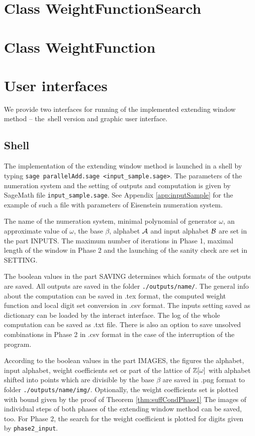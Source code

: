 \section{Class WeightFunctionSearch}



\section{Class WeightFunction}


\section{User interfaces}
We provide two interfaces for running of the implemented extending window method -- the~shell version and graphic user interface.

\subsection{Shell}
The implementation of the extending window method is launched in a shell by typing \verb+sage parallelAdd.sage <input_sample.sage>+. The parameters of the numeration system and the setting of outputs and computation is given by SageMath file \verb+input_sample.sage+. See Appendix \ref{app:inputSample} for the example of such a file with parameters of Eisenstein numeration system.

The name of the numeration system, minimal polynomial of generator $\omega$, an approximate value of $\omega$, the base $\beta$, alphabet $\mathcal{A}$ and input alphabet $\mathcal{B}$ are set in the part INPUTS. The maximum number of iterations in Phase 1, maximal length of the window in Phase 2 and the launching of the sanity check are set in SETTING. 

The boolean values in the part SAVING determines which formats of the outputs are saved. All outputs are saved in the folder \verb+./outputs/name/+. The general info about the computation can be saved in .tex format, the computed weight function and local digit set conversion in .csv format. The inputs setting saved as dictionary can be loaded by the interact interface. The log of the whole computation can be saved as .txt file. There is also an option to save unsolved combinations in Phase 2 in .csv format in the case of the interruption of the program.

According to the boolean values in the part IMAGES, the figures the alphabet, input alphabet, weight coefficients set or part of the lattice of $\mathbb{Z}[\omega]$ with alphabet shifted into points which are divisible by the base $\beta$ are saved in .png format to folder \verb+./outputs/name/img/+. Optionally, the weight coefficients set is plotted with bound given by the proof of Theorem \ref{thm:suffCondPhase1} The images of individual steps of both phases of the extending window method can be saved, too. For Phase 2, the search for the weight coefficient  is plotted for digits given by \verb+phase2_input+.  

